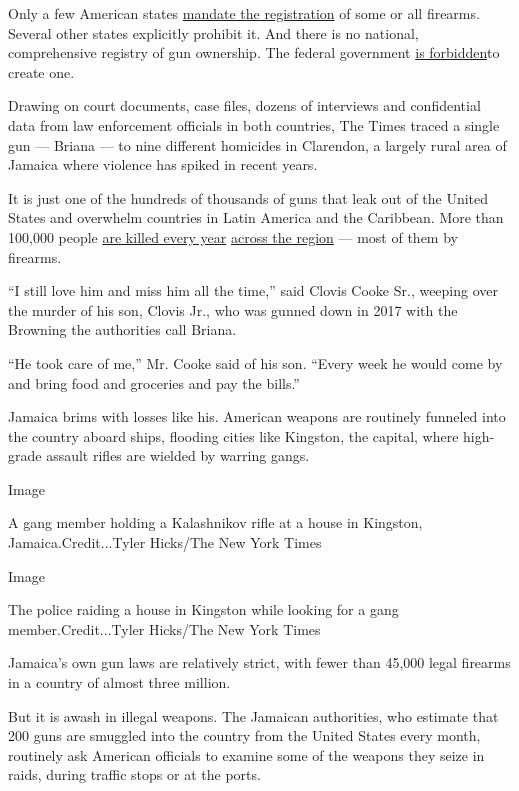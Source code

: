 Only a few American states
\href{https://lawcenter.giffords.org/gun-laws/policy-areas/gun-owner-responsibilities/registration/}{mandate
the registration} of some or all firearms. Several other states
explicitly prohibit it. And there is no national, comprehensive registry
of gun ownership. The federal government
\href{https://www.nraila.org/get-the-facts/registration-licensing/\#_edn4}{is
forbidden}to create one.

Drawing on court documents, case files, dozens of interviews and
confidential data from law enforcement officials in both countries, The
Times traced a single gun --- Briana --- to nine different homicides in
Clarendon, a largely rural area of Jamaica where violence has spiked in
recent years.

It is just one of the hundreds of thousands of guns that leak out of the
United States and overwhelm countries in Latin America and the
Caribbean. More than 100,000 people
\href{https://www.nytimes3xbfgragh.onion/2019/08/18/world/americas/guatemala-violence-women-asylum.html}{are
killed every year}
\href{https://www.nytimes3xbfgragh.onion/interactive/2019/05/04/world/americas/honduras-gang-violence.html}{across
the region} --- most of them by firearms.

``I still love him and miss him all the time,'' said Clovis Cooke Sr.,
weeping over the murder of his son, Clovis Jr., who was gunned down in
2017 with the Browning the authorities call Briana.

``He took care of me,'' Mr. Cooke said of his son. ``Every week he would
come by and bring food and groceries and pay the bills.''

Jamaica brims with losses like his. American weapons are routinely
funneled into the country aboard ships, flooding cities like Kingston,
the capital, where high-grade assault rifles are wielded by warring
gangs.

Image

A gang member holding a Kalashnikov rifle at a house in Kingston,
Jamaica.Credit...Tyler Hicks/The New York Times

Image

The police raiding a house in Kingston while looking for a gang
member.Credit...Tyler Hicks/The New York Times

Jamaica's own gun laws are relatively strict, with fewer than 45,000
legal firearms in a country of almost three million.

But it is awash in illegal weapons. The Jamaican authorities, who
estimate that 200 guns are smuggled into the country from the United
States every month, routinely ask American officials to examine some of
the weapons they seize in raids, during traffic stops or at the ports.

